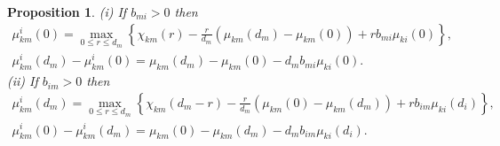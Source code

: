 \documentclass{amsart}
\newtheorem{proposition}[theorem]{Proposition}
\theoremstyle{definition}
\theoremstyle{remark}
\numberwithin{equation}{section}
\numberwithin{theorem}{section}
\begin{document}
\begin{proposition}\label{newmu}
{\rm (i)} If $b_{mi}>0$ then
\begin{equation}\label{newmufrom}
\begin{gathered}
\mu_{km}^i(0)=\max_{0\le r\le d_m}\left\{\chi_{km}(r)-\frac r{d_m}\left(\mu_{km}(d_m)-\mu_{km}(0)\right)
+rb_{mi}\mu_{ki}(0)\right\},\\
\mu_{km}^i(d_m)-\mu_{km}^i(0)=\mu_{km}(d_m)-\mu_{km}(0)-d_mb_{mi}\mu_{ki}(0).
\end{gathered}
\end{equation}
{\rm (ii)} If $b_{im}>0$ then
\begin{equation}\label{newmutom}
\begin{gathered}
\mu_{km}^i(d_m)=\max_{0\le r\le d_m}\left\{\chi_{km}(d_m-r)-\frac r{d_m}\left(\mu_{km}(0)-\mu_{km}(d_m)\right)
+rb_{im}\mu_{ki}(d_i)\right\},\\
\mu_{km}^i(0)-\mu_{km}^i(d_m)=\mu_{km}(0)-\mu_{km}(d_m)-d_mb_{im}\mu_{ki}(d_i).
\end{gathered}
\end{equation}
\end{proposition}
\end{document}
